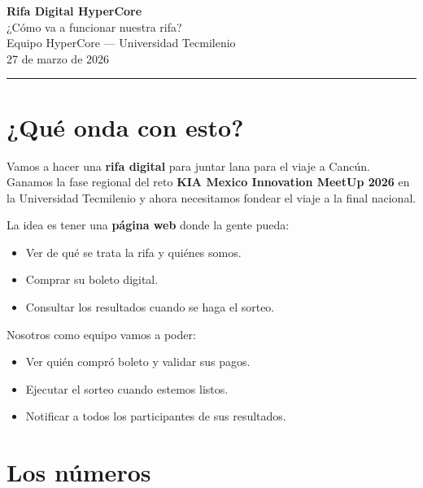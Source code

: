 \documentclass[12pt,a4paper]{article}
\begin{document}
\begin{center}
{\LARGE \textbf{Rifa Digital HyperCore}}\\[0.3em]
{\large ¿Cómo va a funcionar nuestra rifa?}\\[1em]
{\normalsize Equipo HyperCore --- Universidad Tecmilenio}\\
{\normalsize 27 de marzo de 2026}
\end{center}

\vspace{0.5em}
\hrule
\vspace{1em}

\section{¿Qué onda con esto?}

Vamos a hacer una \textbf{rifa digital} para juntar lana para el viaje a Cancún. Ganamos la fase regional del reto \textbf{KIA Mexico Innovation MeetUp 2026} en la Universidad Tecmilenio y ahora necesitamos fondear el viaje a la final nacional.

La idea es tener una \textbf{página web} donde la gente pueda:

\begin{itemize}[leftmargin=2em]
    \item Ver de qué se trata la rifa y quiénes somos.
    \item Comprar su boleto digital.
    \item Consultar los resultados cuando se haga el sorteo.
\end{itemize}

Nosotros como equipo vamos a poder:

\begin{itemize}[leftmargin=2em]
    \item Ver quién compró boleto y validar sus pagos.
    \item Ejecutar el sorteo cuando estemos listos.
    \item Notificar a todos los participantes de sus resultados.
\end{itemize}

\section{Los números}
\end{document}

